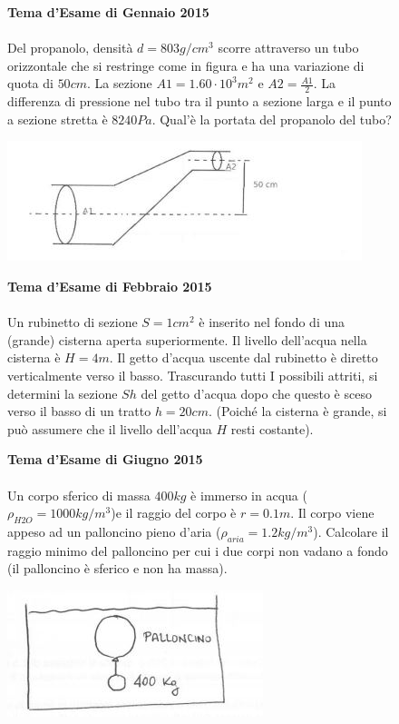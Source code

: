 \begin{figure}[h!]
\textbf{Tema d'Esame di Gennaio 2015}\\ \\
Del propanolo, densità $d=803 g/cm^3$ scorre attraverso un tubo orizzontale che si restringe come in figura e ha una variazione di quota di $50cm$. La sezione $A1=1.60\cdot 10^3m^2$ e $A2=\frac{A1}{2}$. La differenza di pressione nel tubo tra il punto a sezione larga e il punto a sezione stretta è $8240Pa$. Qual'è la portata del propanolo del tubo?
\\
	\begin{center}
		\includegraphics[scale=1.1]{ES4/GEN042015.jpg}
	\end{center}
\end{figure}

\begin{figure}[h!]
\textbf{Tema d'Esame di Febbraio 2015}\\ \\
 Un rubinetto di sezione $S = 1 cm^2$
 è inserito nel fondo di una (grande) cisterna aperta
superiormente. Il livello dell'acqua nella cisterna è $H = 4 m$. Il getto d'acqua uscente dal
rubinetto è diretto verticalmente verso il basso. Trascurando tutti I possibili attriti, si
determini la sezione $Sh$ del getto d'acqua dopo che questo è sceso verso il basso di un tratto
$h = 20 cm$. (Poiché la cisterna è grande, si può assumere che il livello dell'acqua $H$ resti
costante).
\\
\end{figure}

\begin{figure}[h!]
\textbf{Tema d'Esame di Giugno 2015}\\ \\
Un corpo sferico di massa $400kg$ è immerso in acqua ($\rho_{H2O}=1000kg/m^3$)e il raggio del corpo è $r=0.1m$. Il corpo viene appeso ad un palloncino pieno d'aria ($\rho_{aria}=1.2kg/m^3$). Calcolare il raggio minimo del palloncino per cui i due corpi non vadano a fondo (il palloncino è sferico e non ha massa).
\\
\begin{center}
		\includegraphics[scale=1.3]{ES4/GIU042015.jpg}
	\end{center}
\end{figure}

